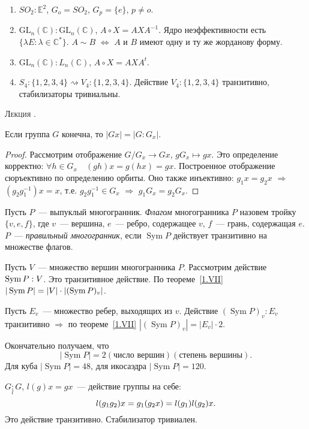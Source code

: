 \documentclass[a4paper]{article}
\newcounter{lec}
\renewcommand{\thelec}{\Roman{lec}}
\newcommand*{\lecture}[1]{\refstepcounter{lec}\vspace{20pt}
\begin{center}{\rmfamily\textsc{Лекция \thelec. \\ \textbf{#1}}}\vspace{5pt}
\end{center}}
\newcommand{\Sym}{\mathop{\mathrm{Sym}}\nolimits}
\newcommand*{\p}[1]{#1\nobreak\discretionary{}{\hbox{$\mathsurround=0pt #1$}}{}}
\begin{document}
\prim
\begin{enumerate}
  \item $SO_2:\mathbb{E}^2$, $G_o=SO_2$, $G_p=\{e\}$, $p\neq o$.
  \item $\mathrm{GL}_n(\mathbb{C}):\mathrm{GL}_n(\mathbb{C})$, $A\circ X=AXA^{-1}$.
  Ядро неэффективности есть $\{\lambda E: \lambda\in\mathbb{C}^*\}$.
  $A\sim B$ $\Leftrightarrow$ $A$ и $B$ имеют одну и ту же жорданову
  форму.
  \item $\mathrm{GL}_n(\mathbb{C}):L_n(\mathbb{C})$, $A\circ X=AXA^t$.
  \item $S_4:\{1,2,3,4\}\rightsquigarrow V_4:\{1,2,3,4\}$. Действие
  $V_4:\{1,2,3,4\}$ транзитивно, стабилизаторы тривиальны.
\end{enumerate}
\lecture{}

\begin{theorem}
\label{1.VII}Если группа $G$ конечна, то $|Gx|=|G:G_x|$.
\end{theorem}

\begin{proof}
Рассмотрим отображение $G/G_x\to Gx$, $gG_x\mapsto gx$. Это
определение корректно: $\forall h\in G_x\quad (gh)x=g(hx)=gx$.
Построенное отображение сюръективно по определению орбиты. Оно также
инъективно: $g_1x=g_2x$ $\Rightarrow$ $(g_2g_1^{-1})x=x$, т.е.
$g_2g_1^{-1}\in G_x$ $\Rightarrow$ $g_1G_x=g_2G_x$.
\end{proof}

Пусть $P$~--- выпуклый многогранник. \emph{Флагом} многогранника $P$
назовем тройку $\{v,e,f\}$, где $v$~--- вершина, $e$~--- ребро,
содержащее $v$, $f$~--- грань, содержащая $e$. $P$~---
\emph{правильный многогранник}, если $\Sym P$ действует транзитивно
на множестве флагов.

Пусть $V$~--- множество вершин многогранника $P$. Рассмотрим
действие $\Sym P\p: V$. Это транзитивное действие. По
теореме~\ref{1.VII} $|\Sym P|\p=|V|\cdot|(\Sym P)_v|$.

Пусть $E_v$~--- множество ребер, выходящих из $v$. Действие $(\Sym
P)_v:E_v$ транзитивно $\Rightarrow$ по теореме~\ref{1.VII} $|(\Sym
P)_v|=|E_v|\cdot 2$.

Окончательно получаем, что $$|\Sym P|=2(\text{число
вершин})(\text{степень вершины}).$$ Для куба $|\Sym P|=48$, для
икосаэдра $|\Sym P|=120$.

$G\mathop{:}\limits_l G$, $l(g)x=gx$~--- действие группы на себе:
$$l(g_1g_2)x=g_1(g_2x)\p=l(g_1)l(g_2)x.$$ Это действие транзитивно.
Стабилизатор тривиален.
\end{document}
